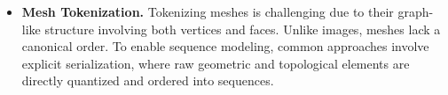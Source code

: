 \documentclass[../../book-main.tex]{subfiles}
\begin{document}
\begin{itemize}



\item \textbf{Mesh Tokenization.}
    Tokenizing meshes is challenging due to their graph-like
    structure involving both vertices and faces.
    Unlike images, meshes lack a canonical order. To enable sequence
    modeling, common approaches involve
    explicit serialization, where raw geometric and topological
    elements are directly quantized and ordered into sequences.




\end{itemize}
\end{document}
